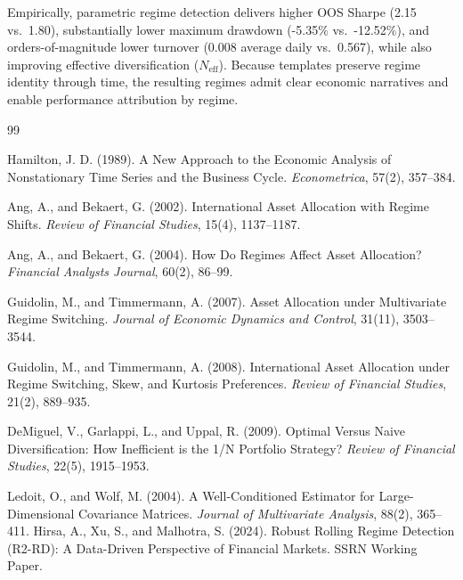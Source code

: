 \documentclass[11pt]{article}
\begin{document}
Empirically, parametric regime detection delivers higher OOS Sharpe (2.15 vs.\ 1.80), substantially lower maximum drawdown (-5.35\% vs.\ -12.52\%),
and orders-of-magnitude lower turnover (0.008 average daily vs.\ 0.567), while also improving effective diversification ($N_{\text{eff}}$).
Because templates preserve regime identity through time, the resulting regimes admit clear economic narratives and enable performance attribution by regime.

\begin{thebibliography}{99}

Hamilton, J. D. (1989).
\newblock A New Approach to the Economic Analysis of Nonstationary Time Series and the Business Cycle.
\newblock \emph{Econometrica}, 57(2), 357--384.

Ang, A., and Bekaert, G. (2002).
\newblock International Asset Allocation with Regime Shifts.
\newblock \emph{Review of Financial Studies}, 15(4), 1137--1187.

Ang, A., and Bekaert, G. (2004).
\newblock How Do Regimes Affect Asset Allocation?
\newblock \emph{Financial Analysts Journal}, 60(2), 86--99.

Guidolin, M., and Timmermann, A. (2007).
\newblock Asset Allocation under Multivariate Regime Switching.
\newblock \emph{Journal of Economic Dynamics and Control}, 31(11), 3503--3544.

Guidolin, M., and Timmermann, A. (2008).
\newblock International Asset Allocation under Regime Switching, Skew, and Kurtosis Preferences.
\newblock \emph{Review of Financial Studies}, 21(2), 889--935.

DeMiguel, V., Garlappi, L., and Uppal, R. (2009).
\newblock Optimal Versus Naive Diversification: How Inefficient is the 1/N Portfolio Strategy?
\newblock \emph{Review of Financial Studies}, 22(5), 1915--1953.

Ledoit, O., and Wolf, M. (2004).
\newblock A Well-Conditioned Estimator for Large-Dimensional Covariance Matrices.
\newblock \emph{Journal of Multivariate Analysis}, 88(2), 365--411.
Hirsa, A., Xu, S., and Malhotra, S. (2024).
\newblock Robust Rolling Regime Detection (R2-RD): A Data-Driven Perspective of Financial Markets.
\newblock SSRN Working Paper.
\end{thebibliography}
\end{document}

